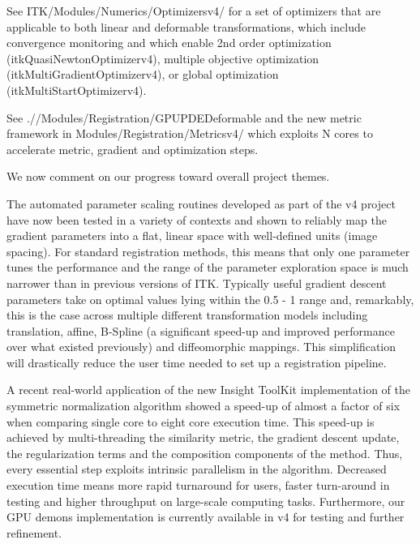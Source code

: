 \documentclass{frontiersSCNS}
\begin{document}
See ITK/Modules/Numerics/Optimizersv4/ for a set of optimizers that are applicable to both linear and deformable transformations, which include convergence monitoring and which enable 2nd order optimization (itkQuasiNewtonOptimizerv4), multiple objective optimization (itkMultiGradientOptimizerv4), or global optimization (itkMultiStartOptimizerv4).  

See .//Modules/Registration/GPUPDEDeformable and the new metric framework in Modules/Registration/Metricsv4/ which exploits N cores to accelerate metric, gradient and optimization steps.  

We now comment on our progress toward overall project themes.

The automated parameter scaling routines developed as part of the v4 project have now been tested in a variety of contexts and shown to reliably map the gradient parameters into a flat, linear space with well-defined units (image spacing). For standard registration methods, this means that only one parameter tunes the performance and the range of the parameter exploration space is much narrower than in previous versions of ITK. Typically useful gradient descent parameters take on optimal values lying within the 0.5 - 1 range and, remarkably, this is the case across multiple different transformation models including translation, affine, B-Spline (a significant speed-up and improved performance over what existed previously) and diffeomorphic mappings. This simplification will drastically reduce the user time needed to set up a registration pipeline. 

A recent real-world application of the new Insight ToolKit implementation of the symmetric normalization algorithm showed a speed-up of almost a factor of six when comparing single core to eight core execution time. This speed-up is achieved by multi-threading the similarity metric, the gradient descent update, the regularization terms and the composition components of the method. Thus, every essential step exploits intrinsic parallelism in the algorithm. Decreased execution time means more rapid turnaround for users, faster turn-around in testing and higher throughput on large-scale computing tasks.  Furthermore, our GPU demons implementation is currently available in v4 for testing and further refinement.
\end{document}

